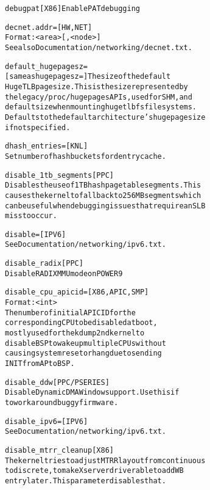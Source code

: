 \documentclass[a4paper,8pt,english]{sphinxmanual}
\begin{document}
\begin{alltt}
        debugpat        {[}X86{]} Enable PAT debugging

        decnet.addr=    {[}HW,NET{]}
                        Format: \textless{}area\textgreater{}{[},\textless{}node\textgreater{}{]}
                        See also Documentation/networking/decnet.txt.

        default\_hugepagesz=
                        {[}same as hugepagesz={]} The size of the default
                        HugeTLB page size. This is the size represented by
                        the legacy /proc/ hugepages APIs, used for SHM, and
                        default size when mounting hugetlbfs filesystems.
                        Defaults to the default architecture's huge page size
                        if not specified.

        dhash\_entries=  {[}KNL{]}
                        Set number of hash buckets for dentry cache.

        disable\_1tb\_segments {[}PPC{]}
                        Disables the use of 1TB hash page table segments. This
                        causes the kernel to fall back to 256MB segments which
                        can be useful when debugging issues that require an SLB
                        miss to occur.

        disable=        {[}IPV6{]}
                        See Documentation/networking/ipv6.txt.

        disable\_radix   {[}PPC{]}
                        Disable RADIX MMU mode on POWER9

        disable\_cpu\_apicid= {[}X86,APIC,SMP{]}
                        Format: \textless{}int\textgreater{}
                        The number of initial APIC ID for the
                        corresponding CPU to be disabled at boot,
                        mostly used for the kdump 2nd kernel to
                        disable BSP to wake up multiple CPUs without
                        causing system reset or hang due to sending
                        INIT from AP to BSP.

        disable\_ddw     {[}PPC/PSERIES{]}
                        Disable Dynamic DMA Window support. Use this if
                        to workaround buggy firmware.

        disable\_ipv6=   {[}IPV6{]}
                        See Documentation/networking/ipv6.txt.

        disable\_mtrr\_cleanup {[}X86{]}
                        The kernel tries to adjust MTRR layout from continuous
                        to discrete, to make X server driver able to add WB
                        entry later. This parameter disables that.


\end{alltt}
\end{document}
